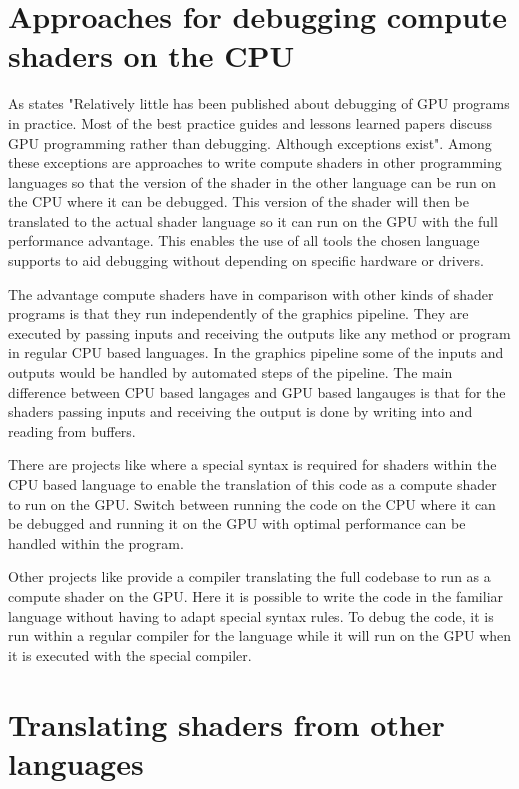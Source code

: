 \section{Approaches for debugging compute shaders on the CPU}
\label{section:computeApproaches}

As  states "Relatively little has been published about debugging of GPU programs  in  practice.  Most  of  the  best  practice  guides  and lessons learned papers discuss GPU programming rather than debugging. Although exceptions exist". Among these exceptions are approaches to write compute shaders in other programming languages so that the version of the shader in the other language can be run on the CPU where it can be debugged. This version of the shader will then be translated to the actual shader language so it can run on the GPU with the full performance advantage. This enables the use of all tools the chosen language supports to aid debugging without depending on specific hardware or drivers.

The advantage compute shaders have in comparison with other kinds of shader programs is that they run independently of the graphics pipeline. They are executed by passing inputs and receiving the outputs like any method or program in regular CPU based languages. In the graphics pipeline some of the inputs and outputs would be handled by automated steps of the pipeline. The main difference between CPU based langages and GPU based langauges is that for the shaders passing inputs and receiving the output is done by writing into and reading from buffers.

There are projects like  where a special syntax is required for shaders within the CPU based language to enable the translation of this code as a compute shader to run on the GPU. Switch between running the code on the CPU where it can be debugged and running it on the GPU with optimal performance can be handled within the program.

Other projects like  provide a compiler translating the full codebase to run as a compute shader on the GPU. Here it is possible to write the code in the familiar language without having to adapt special syntax rules. To debug the code, it is run within a regular compiler for the language while it will run on the GPU when it is executed with the special compiler.

\section{Translating shaders from other languages}\label{section:translating}

